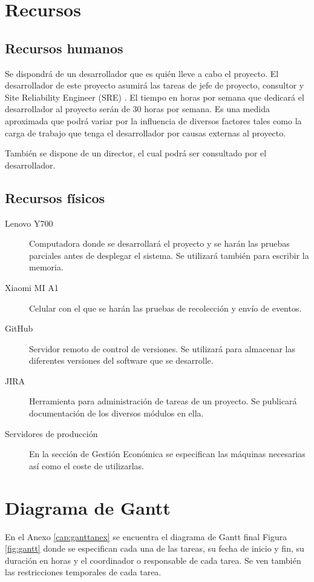\section{Recursos}
\subsection{Recursos humanos}
Se dispondrá de un desarrollador que es quién lleve a cabo el proyecto. El desarrollador de este proyecto asumirá las tareas de jefe de proyecto, consultor y Site Reliability Engineer (SRE) \cite{Tfg:sre}. El tiempo en horas por semana que dedicará el desarrollador al proyecto serán de 30 horas por semana. Es una medida aproximada que podrá variar por la influencia de diversos factores tales como la carga de trabajo que tenga el desarrollador por causas externas al proyecto.

También se dispone de un director, el cual podrá ser consultado por el desarrollador.

\subsection{Recursos físicos}\label{cap:recfis}
\begin{description}

	\item [Lenovo Y700] Computadora donde se desarrollará el proyecto y se harán las pruebas parciales antes de desplegar el sistema. Se utilizará también para escribir la memoria.
	
	\item [Xiaomi MI A1] Celular con el que se harán las pruebas de recolección y envío de eventos.
	
	\item [GitHub] Servidor remoto de control de versiones. Se utilizará para almacenar las diferentes versiones del software que se desarrolle.
	
	\item [JIRA] Herramienta para administración de tareas de un proyecto. Se publicará documentación de los diversos módulos en ella.
	
	\item [Servidores de producción] En la sección de Gestión Económica se especifican las máquinas necesarias así como el coste de utilizarlas.
\end{description}

\section{Diagrama de Gantt}\label{cap:gantt}
En el Anexo \ref{cap:ganttanex} se encuentra el diagrama de Gantt final Figura \ref{fig:gantt} donde se especifican cada una de las tareas, su fecha de inicio y fin, su duración en horas y el coordinador o responsable de cada tarea. Se ven también las restricciones temporales de cada tarea.


